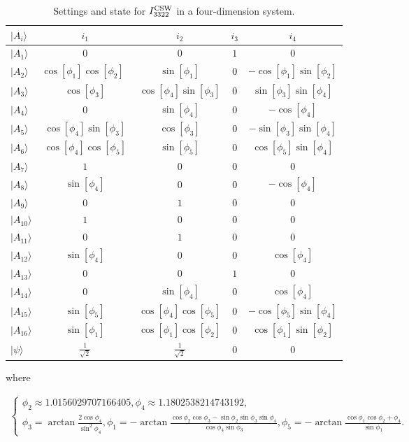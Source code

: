 \documentclass[pra,aps,notitlepage,superscriptaddress,showpacs,showkeys]{revtex4-1}
\theoremstyle{definition}
\theoremstyle{remark}
\begin{document}
\begin{table}[t]
\centering
  \begin{tabular}{lcccc} \hline \hline
$|A_i\rangle$ & $i_1$ & $i_2$ & $i_3$ & $i_4$  \\
\hline
$|A_1\rangle$  & $0$ & $0$ & $1$ & $0$  \\
$|A_2\rangle$  & $\cos{[\phi_1]}\cos{[\phi_2]}\ \ $ & $\sin{[\phi_1]}$ & $0$ & $-\cos{[\phi_1]}\sin{[\phi_2]}$\\
$|A_3\rangle$  & $\cos{[\phi_3]}$ & $\cos{[\phi_4]}\sin{[\phi_3]}$ & $0$ & $\sin{[\phi_3]}\sin{[\phi_4]}$ \\
$|A_4\rangle$  & $0$ & $\sin{[\phi_4]}$ & $0$ & $-\cos{[\phi_4]}$ \\
$|A_5\rangle$  & $\cos{[\phi_4]}\sin{[\phi_3]}$ & $\cos{[\phi_3]}$ & $0$ & $-\sin{[\phi_3]}\sin{[\phi_4]}$ \\
$|A_6\rangle$  & $\cos{[\phi_4]}\cos{[\phi_5]}$ & $\sin{[\phi_5]}$ & $0$ & $\cos{[\phi_5]}\sin{[\phi_4]}$ \\
$|A_7\rangle$  & $1$ & $0$ & $0$ & $0$ \\
$|A_8\rangle$  & $\sin{[\phi_4]}$ & $0$ & $0$ & $-\cos{[\phi_4]}$  \\
$|A_9\rangle$  & $0$ & $1$ & $0$ & $0$  \\
$|A_{10}\rangle$ & $1$ & $0$ & $0$ & $0$  \\
$|A_{11}\rangle$ & $0$ & $1$ & $0$ & $0$  \\
$|A_{12}\rangle$ & $\sin{[\phi_4]}$ & $0$ & $0$ & $\cos{[\phi_4]}$  \\
$|A_{13}\rangle$ & $0$ & $0$ & $1$ & $0$ \\
$|A_{14}\rangle$ & $0$ & $\sin{[\phi_4]}$ & $0$ & $\cos{[\phi_4]}$  \\
$|A_{15}\rangle$ & $\sin{[\phi_5]}$ & $\cos{[\phi_4]}\cos{[\phi_5]}$ & $0$ & $-\cos{[\phi_5]}\sin{[\phi_4]}$  \\
$|A_{16}\rangle$ & $\sin{[\phi_1]}$ & $\cos{[\phi_1]}\cos{[\phi_2]}$ & $0$ & $\cos{[\phi_1]}\sin{[\phi_2]}$  \\
\hline
$|\psi\rangle$ & $\frac{1}{\sqrt{2}}$ & $\frac{1}{\sqrt{2}}$ & $0$ & $0$\\
  \hline \hline
   \end{tabular}
\caption{Settings and state for $I_{3322}^{\rm CSW}$ in a four-dimension system.}
\label{four-dimension}
\end{table}
where
\begin{widetext}
\begin{eqnarray}
\left\{
  \begin{array}{ll}
    \phi_{2}\approx 1.0156029707166405,\phi_{4}\approx 1.1802538214743192,\\
    \phi_{3}=\arctan{\frac{2\cos{\phi_4}}{\sin^2{\phi_4}}},
\phi_{1}=-\arctan{\frac{\cos{\phi_2}\cos{\phi_3}-\sin{\phi_2}\sin{\phi_3}\sin{\phi_4}}{\cos{\phi_4}\sin{\phi_3}}},
\phi_{5}=-\arctan{\frac{\cos{\phi_1}\cos{\phi_2+\phi_4}}{\sin{\phi_1}}}.
\end{array}
\right.
\end{eqnarray}
\end{widetext}
\end{document}

